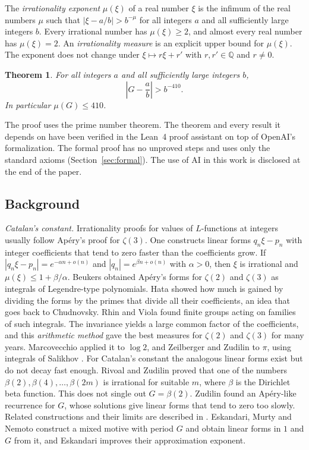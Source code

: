 \documentclass[11pt]{amsart}
\newtheorem{theorem}{Theorem}[section]
\theoremstyle{definition}
\theoremstyle{remark}
\numberwithin{equation}{section}
\newcommand{\Q}{\mathbb Q}
\begin{document}
The \emph{irrationality exponent} $\mu(\xi)$ of a real number $\xi$ is the infimum of the real numbers
$\mu$ such that $|\xi-a/b|>b^{-\mu}$ for all integers $a$ and all sufficiently large integers $b$. Every
irrational number has $\mu(\xi)\ge2$, and almost every real number has $\mu(\xi)=2$. An
\emph{irrationality measure} is an explicit upper bound for $\mu(\xi)$. The exponent does not change under
$\xi\mapsto r\xi+r'$ with $r,r'\in\Q$ and $r\ne0$.

\begin{theorem}\label{thm:main}
For all integers $a$ and all sufficiently large integers $b$,
\[
 \left|G-\frac ab\right|>b^{-410}.
\]
In particular $\mu(G)\le410$.
\end{theorem}

The proof uses the prime number theorem. The theorem and every result it depends on have been verified
in the Lean~4 proof assistant on top of OpenAI's formalization. The formal proof has no unproved steps
and uses only the standard axioms (Section~\ref{sec:formal}). The use of AI in this work is disclosed at
the end of the paper.

\subsection{Background}
\emph{Catalan's constant.} Irrationality proofs for values of $L$-functions at integers usually follow
Ap\'ery's proof for $\zeta(3)$. One constructs linear forms $q_n\xi-p_n$ with integer coefficients that
tend to zero faster than the coefficients grow. If $|q_n\xi-p_n|=e^{-\alpha n+o(n)}$ and
$|q_n|=e^{\beta n+o(n)}$ with $\alpha>0$, then $\xi$ is irrational and $\mu(\xi)\le1+\beta/\alpha$.
Beukers \cite{Beukers79} obtained Ap\'ery's forms for $\zeta(2)$ and $\zeta(3)$ as integrals of
Legendre-type polynomials. Hata \cite{Hata93} showed how much is gained by dividing the forms by the
primes that divide all their coefficients, an idea that goes back to Chudnovsky. Rhin and Viola
\cite{RhinViola96,RhinViola01} found finite groups acting on families of such integrals. The invariance
yields a large common factor of the coefficients, and this \emph{arithmetic method} gave the best
measures for $\zeta(2)$ and $\zeta(3)$ for many years. Marcovecchio \cite{Marcovecchio09} applied it to
$\log2$, and Zeilberger and Zudilin \cite{ZeilbergerZudilin20} to $\pi$, using integrals of Salikhov
\cite{Salikhov08}. For Catalan's constant the analogous linear forms exist but do not decay fast enough.
Rivoal and Zudilin \cite{RivoalZudilin2003} proved that one of the numbers $\beta(2),\beta(4),\ldots,\beta(2m)$
is irrational for suitable $m$, where $\beta$ is the Dirichlet beta function. This does not single out
$G=\beta(2)$. Zudilin \cite{Zudilin2003} found an Ap\'ery-like recurrence for $G$, whose solutions give
linear forms that tend to zero too slowly. Related constructions and their limits are described in
\cite{Zudilin02Cheb,KrattRivoal08,KrattZudilin19,Zudilin19Survey}. Eskandari, Murty and Nemoto
\cite{EMN2025} construct a mixed motive with period $G$ and obtain linear forms in $1$ and $G$ from it, and
Eskandari \cite{Eskandari2026} improves their approximation exponent.
\end{document}
